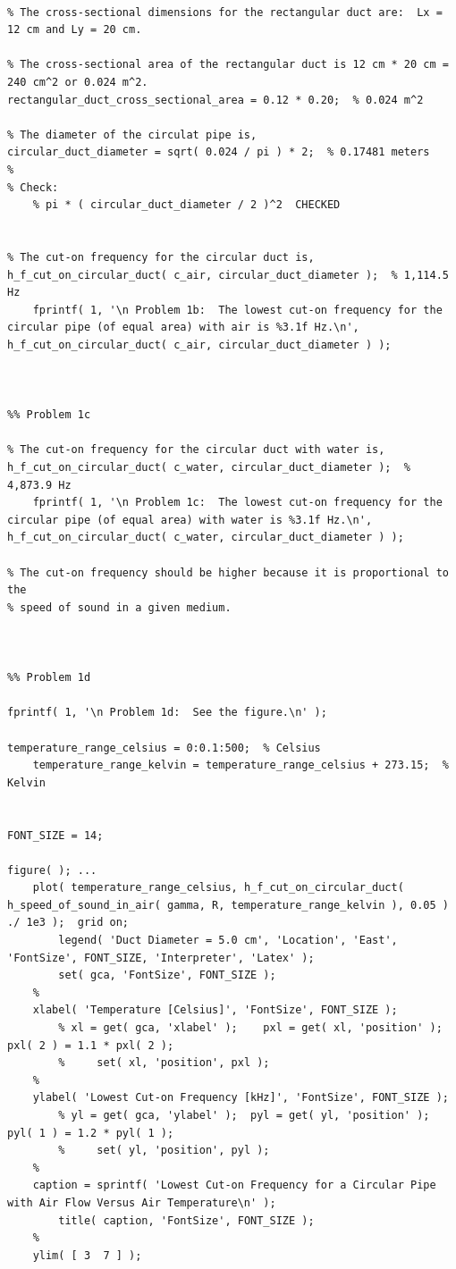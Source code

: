 \begin{lstlisting}[style=Matlab-editor, basicstyle=\fontfamily{pcr}, numbers=none, keepspaces, mlshowsectionrules, basicstyle=\footnotesize]
%% Problem 1b

% The cross-sectional dimensions for the rectangular duct are:  Lx = 12 cm and Ly = 20 cm.

% The cross-sectional area of the rectangular duct is 12 cm * 20 cm = 240 cm^2 or 0.024 m^2.
rectangular_duct_cross_sectional_area = 0.12 * 0.20;  % 0.024 m^2

% The diameter of the circulat pipe is,
circular_duct_diameter = sqrt( 0.024 / pi ) * 2;  % 0.17481 meters
%
% Check:
    % pi * ( circular_duct_diameter / 2 )^2  CHECKED


% The cut-on frequency for the circular duct is,
h_f_cut_on_circular_duct( c_air, circular_duct_diameter );  % 1,114.5 Hz
    fprintf( 1, '\n Problem 1b:  The lowest cut-on frequency for the circular pipe (of equal area) with air is %3.1f Hz.\n', h_f_cut_on_circular_duct( c_air, circular_duct_diameter ) );



%% Problem 1c

% The cut-on frequency for the circular duct with water is,
h_f_cut_on_circular_duct( c_water, circular_duct_diameter );  % 4,873.9 Hz
    fprintf( 1, '\n Problem 1c:  The lowest cut-on frequency for the circular pipe (of equal area) with water is %3.1f Hz.\n', h_f_cut_on_circular_duct( c_water, circular_duct_diameter ) );

% The cut-on frequency should be higher because it is proportional to the
% speed of sound in a given medium.



%% Problem 1d

fprintf( 1, '\n Problem 1d:  See the figure.\n' );

temperature_range_celsius = 0:0.1:500;  % Celsius
    temperature_range_kelvin = temperature_range_celsius + 273.15;  % Kelvin


FONT_SIZE = 14;

figure( ); ...
    plot( temperature_range_celsius, h_f_cut_on_circular_duct( h_speed_of_sound_in_air( gamma, R, temperature_range_kelvin ), 0.05 ) ./ 1e3 );  grid on;
        legend( 'Duct Diameter = 5.0 cm', 'Location', 'East', 'FontSize', FONT_SIZE, 'Interpreter', 'Latex' );
        set( gca, 'FontSize', FONT_SIZE );
    %
    xlabel( 'Temperature [Celsius]', 'FontSize', FONT_SIZE );
        % xl = get( gca, 'xlabel' );    pxl = get( xl, 'position' );  pxl( 2 ) = 1.1 * pxl( 2 );
        %     set( xl, 'position', pxl );
    %
    ylabel( 'Lowest Cut-on Frequency [kHz]', 'FontSize', FONT_SIZE );
        % yl = get( gca, 'ylabel' );  pyl = get( yl, 'position' );  pyl( 1 ) = 1.2 * pyl( 1 );
        %     set( yl, 'position', pyl );
    %
    caption = sprintf( 'Lowest Cut-on Frequency for a Circular Pipe with Air Flow Versus Air Temperature\n' );
        title( caption, 'FontSize', FONT_SIZE );
    %
    ylim( [ 3  7 ] );




\end{lstlisting}
